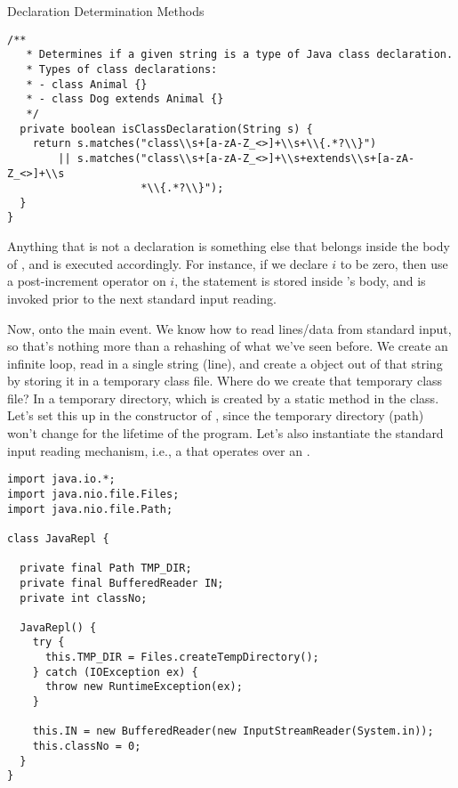 \begin{cl}{Declaration Determination Methods}
\begin{lstlisting}[language=MyJava]
  /**
   * Determines if a given string is a type of Java class declaration.
   * Types of class declarations:
   * - class Animal {}
   * - class Dog extends Animal {}
   */
  private boolean isClassDeclaration(String s) {
    return s.matches("class\\s+[a-zA-Z_<>]+\\s+\\{.*?\\}") 
        || s.matches("class\\s+[a-zA-Z_<>]+\\s+extends\\s+[a-zA-Z_<>]+\\s
                     *\\{.*?\\}");
  }
}
\end{lstlisting}
\end{cl}

Anything that is not a declaration is something else that belongs inside the body of , and is executed accordingly. For instance, if we declare $i$ to be zero, then use a post-increment operator on $i$, the  statement is stored inside 's  body, and is invoked prior to the next standard input reading. 

Now, onto the main event. We know how to read lines/data from standard input, so that's nothing more than a rehashing of what we've seen before. We create an infinite loop, read in a single string (line), and create a  object out of that string by storing it in a temporary class file. Where do we create that temporary class file? In a temporary directory, which is created by a static method in the class. Let's set this up in the constructor of , since the temporary directory (path) won't change for the lifetime of the program. Let's also instantiate the standard input reading mechanism, i.e., a  that operates over an .

\begin{cl}{}
\begin{lstlisting}[language=MyJava]
import java.io.*;
import java.nio.file.Files;
import java.nio.file.Path;

class JavaRepl {

  private final Path TMP_DIR;
  private final BufferedReader IN; 
  private int classNo;

  JavaRepl() {
    try {
      this.TMP_DIR = Files.createTempDirectory();
    } catch (IOException ex) {
      throw new RuntimeException(ex);
    } 
    
    this.IN = new BufferedReader(new InputStreamReader(System.in));
    this.classNo = 0;
  }
}
\end{lstlisting}
\end{cl}

